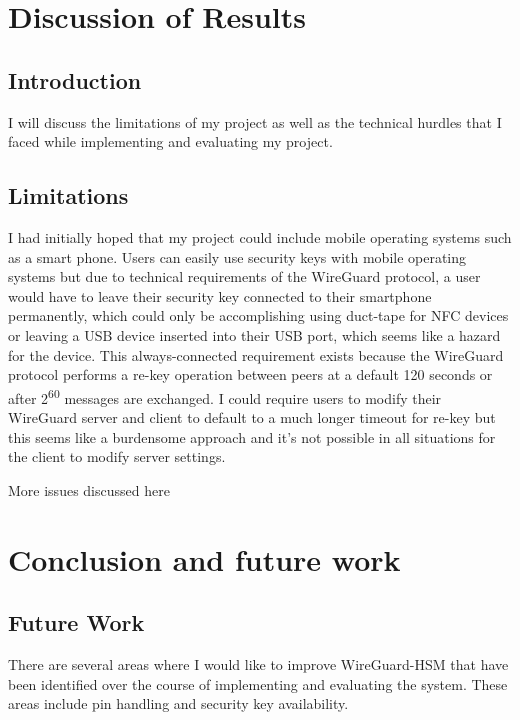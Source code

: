 \documentclass [11pt, proquest] {uwthesis}[2020/02/24]
\begin{document}
\chapter {Discussion of Results}
\section {Introduction}
I will discuss the limitations of my project as well as the technical hurdles that I faced while implementing and evaluating my project.

\section {Limitations}
I had initially hoped that my project could include mobile operating systems such as a smart phone. Users can easily use security keys
with mobile operating systems but due to technical requirements of the WireGuard protocol, a user would have to leave their security key connected
to their smartphone permanently, which could only be accomplishing using duct-tape for NFC devices or leaving a USB device inserted into their USB port, which 
seems like a hazard for the device. This always-connected requirement exists because the WireGuard protocol performs a re-key operation between peers at a default 120 seconds 
or after 2\textsuperscript{60} messages are exchanged. I could require users to modify their WireGuard server and client to default to a much longer 
timeout for re-key but this seems like a burdensome approach and it's not possible in all situations for the client to modify server settings.

More issues discussed here 


\chapter {Conclusion and future work}

\section {Future Work}
There are several areas where I would like to improve WireGuard-HSM that have been identified over the course of implementing and evaluating the system. These areas include pin handling and security key availability. 
\end{document}
